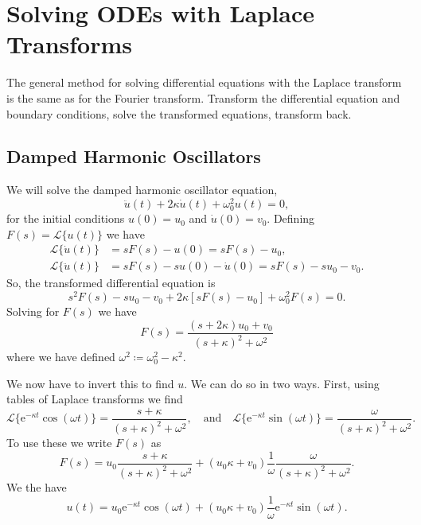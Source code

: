 \documentclass[fleqn]{NotesClass}
\newcommand*{\e}{\mathrm{e}}
\newcommand*{\laplaceTransform}{\mathcal{L}}
\begin{document}
    \section{Solving ODEs with Laplace Transforms}
    The general method for solving differential equations with the Laplace transform is the same as for the Fourier transform.
    Transform the differential equation and boundary conditions, solve the transformed equations, transform back.
    
    \subsection{Damped Harmonic Oscillators}
    We will solve the damped harmonic oscillator equation,
    \begin{equation}
        \ddot{u}(t) + 2\kappa\dot{u}(t) + \omega_0^2u(t) = 0,
    \end{equation}
    for the initial conditions \(u(0) = u_0\) and \(\dot{u}(0) = v_0\).
    Defining \(F(s) = \laplaceTransform\{u(t)\}\) we have
    \begin{align}
        \laplaceTransform\{\dot{u}(t)\} &= sF(s) - u(0) = sF(s) - u_0,\\
        \laplaceTransform\{\ddot{u}(t)\} &= sF(s) - su(0) - \dot{u}(0) = sF(s) - su_0 - v_0.
    \end{align}
    So, the transformed differential equation is
    \begin{equation}
        s^2F(s) - su_0 - v_0 + 2\kappa[sF(s) - u_0] + \omega_0^2 F(s) = 0.
    \end{equation}
    Solving for \(F(s)\) we have
    \begin{equation}
        F(s) = \frac{(s + 2\kappa)u_0 + v_0}{(s + \kappa)^2 + \omega^2}
    \end{equation}
    where we have defined \(\omega^2 \coloneqq \omega_0^2 - \kappa^2\).
    
    We now have to invert this to find \(u\).
    We can do so in two ways.
    First, using tables of Laplace transforms we find
    \begin{equation}
        \laplaceTransform\{\e^{-\kappa t}\cos(\omega t)\} = \frac{s + \kappa}{(s + \kappa)^2 + \omega^2}, \quad\text{and}\quad \laplaceTransform\{\e^{-\kappa t}\sin(\omega t)\} = \frac{\omega}{(s + \kappa)^2 + \omega^2}.
    \end{equation}
    To use these we write \(F(s)\) as
    \begin{equation}
        F(s) = u_0\frac{s + \kappa}{(s + \kappa)^2 + \omega^2} + (u_0\kappa + v_0)\frac{1}{\omega} \frac{\omega}{(s + \kappa)^2 + \omega^2}.
    \end{equation}
    We the have
    \begin{equation}
        u(t) = u_0\e^{-\kappa t}\cos(\omega t) + (u_0\kappa + v_0)\frac{1}{\omega}\e^{-\kappa t}\sin(\omega t).
    \end{equation}
    
\end{document}
